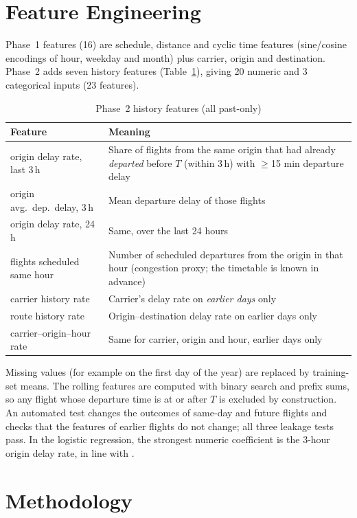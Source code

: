\documentclass[conference]{IEEEtran}
\begin{document}
\section{Feature Engineering}
Phase~1 features (16) are schedule, distance and cyclic time features (sine/cosine encodings of hour, weekday and month) plus carrier, origin and destination. Phase~2 adds seven history features (Table~\ref{tab:feat}), giving 20 numeric and 3 categorical inputs (23 features).

\begin{table}[t]
\caption{Phase~2 history features (all past-only)}
\label{tab:feat}
\centering
\small
\begin{tabular}{p{2.6cm}p{4.9cm}}
\toprule
Feature & Meaning\\
\midrule
origin delay rate, last 3\,h & Share of flights from the same origin that had already \emph{departed} before $T$ (within 3\,h) with $\ge$15 min departure delay\\
origin avg.\ dep.\ delay, 3\,h & Mean departure delay of those flights\\
origin delay rate, 24\,h & Same, over the last 24 hours\\
flights scheduled same hour & Number of scheduled departures from the origin in that hour (congestion proxy; the timetable is known in advance)\\
carrier history rate & Carrier's delay rate on \emph{earlier days} only\\
route history rate & Origin--destination delay rate on earlier days only\\
carrier--origin--hour rate & Same for carrier, origin and hour, earlier days only\\
\bottomrule
\end{tabular}
\end{table}

Missing values (for example on the first day of the year) are replaced by training-set means. The rolling features are computed with binary search and prefix sums, so any flight whose departure time is at or after $T$ is excluded by construction. An automated test changes the outcomes of same-day and future flights and checks that the features of earlier flights do not change; all three leakage tests pass. In the logistic regression, the strongest numeric coefficient is the 3-hour origin delay rate, in line with \cite{rebollo}.

\section{Methodology}
\end{document}
